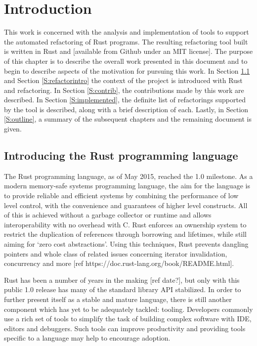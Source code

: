 \chapter{Introduction}\label{C:intro}
This work is concerned with the analysis and implementation of tools to support the automated refactoring of Rust programs. The resulting refactoring tool built is written in Rust and [available from Github under an MIT license]. The purpose of this chapter is to describe the overall work presented in this document and to begin to describe aspects of the motivation for pursuing this work. In Section \ref{S:rustintro} and Section \ref{S:refactorintro} the context of the project is introduced with Rust and refactoring. In Section \ref{S:contrib}, the contributions made by this work are described. In Section \ref{S:implemented}, the definite list of refactorings supported by the tool is described, along with a brief description of each. Lastly, in Section \ref{S:outline}, a summary of the subsequent chapters and the remaining document is given.


\section{Introducing the Rust programming language}\label{S:rustintro}


The Rust programming language, as of May 2015, reached the 1.0 milestone.  As a modern memory-safe systems programming language, the aim for the language is to provide reliable and efficient systems by combining the performance of low level control, with the convenience and guarantees of higher level constructs. All of this is achieved without a garbage collector or runtime and allows interoperability with no overhead with C. Rust enforces an ownership system to restrict the duplication of references through borrowing and lifetimes, while still aiming for `zero cost abstractions'. Using this techniques, Rust prevents dangling pointers and whole class of related issues concerning iterator invalidation, concurrency and more [ref https://doc.rust-lang.org/book/README.html].

Rust has been a number of years in the making [ref date?], but only with this public 1.0 release has many of the standard library API stabilized. In order to further present itself as a stable and mature language, there is still another component which has yet to be adequately tackled: tooling. Developers commonly use a rich set of tools to simplify the task of building complex software with IDE, editors and debuggers. Such tools can improve productivity and providing tools specific to a language may help to encourage adoption.

